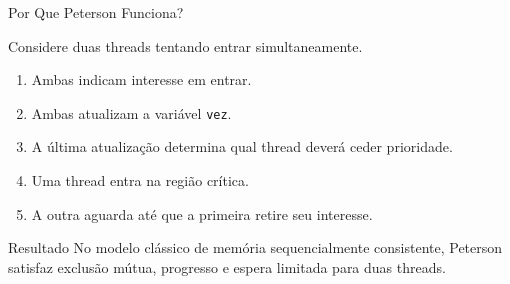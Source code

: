\documentclass[aspectratio=169,11pt]{beamer}
\begin{document}

\begin{frame}{Por Que Peterson Funciona?}

Considere duas threads tentando entrar
simultaneamente.

\vspace{0.3cm}

\begin{enumerate}
    \setlength{\itemsep}{0.3cm}

    \item Ambas indicam interesse em entrar.

    \item Ambas atualizam a variável \texttt{vez}.

    \item A última atualização determina
          qual thread deverá ceder prioridade.

    \item Uma thread entra na região crítica.

    \item A outra aguarda até que a primeira
          retire seu interesse.
\end{enumerate}

\vspace{0.3cm}

\begin{block}{Resultado}
No modelo clássico de memória sequencialmente
consistente, Peterson satisfaz exclusão mútua,
progresso e espera limitada para duas threads.
\end{block}

\vspace{0.2cm}

\end{frame}

\end{document}
